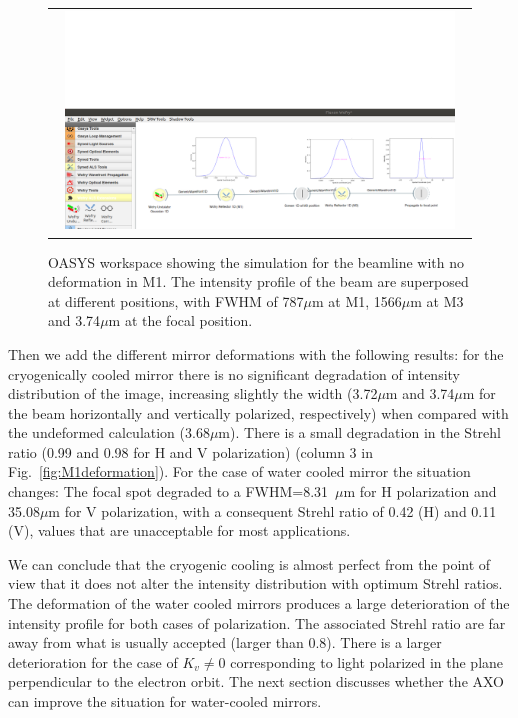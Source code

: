 \documentclass{iucr}              %
\begin{document}
\begin{figure} 
\begin{center}
\begin{tabular}{c} 
\includegraphics[trim=0 0 5 200,clip,width=0.95\textwidth]{figures/wofrynodeformation.png}

\end{tabular}
\end{center}
\caption
{ \label{fig:nodeformation} 
OASYS workspace showing the simulation for the beamline with no deformation in M1. The intensity profile of the beam are superposed at different positions, with FWHM of 787$\mu$m at M1, 1566$\mu$m at M3 and 3.74$\mu$m at the focal position.  }
\end{figure} 

Then we add the different mirror deformations with the following results: for the cryogenically cooled mirror there is no significant degradation of intensity distribution of the image, increasing slightly the width (3.72$\mu$m and 3.74$\mu$m for the beam horizontally and vertically polarized, respectively) when compared with the undeformed calculation (3.68$\mu$m). There is a small degradation in the Strehl ratio (0.99 and 0.98 for H and V polarization) (column 3 in Fig.~\ref{fig:M1deformation}). For the case of water cooled mirror the situation changes: The focal spot degraded to a FWHM=8.31~$\mu$m for H polarization and 35.08$\mu$m for V polarization, with a consequent Strehl ratio of 0.42 (H) and 0.11 (V), values that are unacceptable for most applications. 

We can conclude that the cryogenic cooling is almost perfect from the point of view that it does not alter the intensity distribution with optimum Strehl ratios. The deformation of the water cooled mirrors produces a large deterioration of the intensity profile for both cases of polarization. The associated Strehl ratio are far away from what is usually accepted (larger than 0.8). There is a larger deterioration for the case of $K_v\ne 0$ corresponding to light polarized in the plane perpendicular to the electron orbit. The next section discusses whether the AXO can improve the situation for water-cooled mirrors.    
\end{document}
